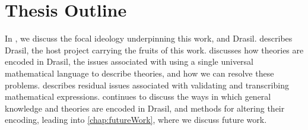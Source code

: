\section{Thesis Outline}
\label{sec:intro:outline}

In , we discuss the focal ideology underpinning this work,
and Drasil.  describes Drasil, the host project carrying the
fruits of this work.  discusses how theories are encoded
in Drasil, the issues associated with using a single universal mathematical
language to describe theories, and how we can resolve these problems.
 describes residual issues associated with validating and
transcribing mathematical expressions.  continues to
discuss the ways in which general knowledge and theories are encoded in Drasil,
and methods for altering their encoding, leading into \cref{chap:futureWork},
where we discuss future work.
